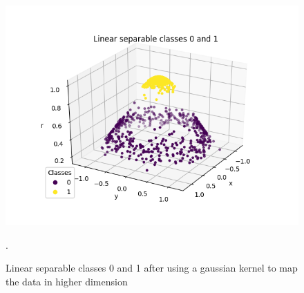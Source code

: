 \documentclass[../Main/thesis.tex]{subfiles}
\begin{document}
\begin{figure}[H] %
   \centering
   \includegraphics[width=6.5in]{../fig/linearseparable.png} 
   \caption{Linear separable classes 0 and 1 after using a gaussian kernel to map the data in higher dimension}.
   \label{fig:kernelsvm1}
\end{figure}
\end{document}
